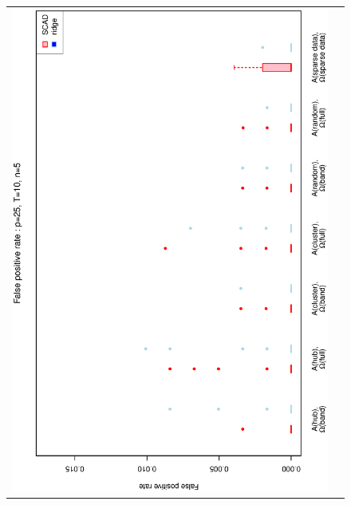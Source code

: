 \documentclass[a4paper]{article}
\begin{document}
\begin{figure}[htb!]
\centering
\begin{tabular}{cc}
\includegraphics[scale=0.5,angle=270]{ROCfpr25T10N5a.eps}\\

\end{tabular}
\end{figure}
\end{document}
